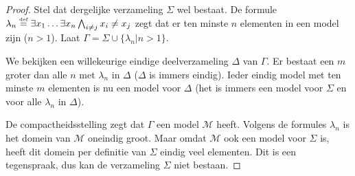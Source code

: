 \documentclass[a4paper,11pt]{article}
\begin{document}
\begin{proof}
Stel dat dergelijke verzameling $\Sigma$ wel bestaat. De formule
$\lambda_{n} \overset{\text{\tiny{def}}}{=} \exists x_{1} \ldots \exists x_{n} \bigwedge_{i \ne j} x_{i} \ne x_{j}$
zegt dat er ten minste $n$ elementen in een model zijn ($n > 1$). Laat
$\Gamma = \Sigma \cup \{\lambda_{n} | n>1\}$.

We bekijken een willekeurige eindige deelverzameling $\Delta$ van $\Gamma$. Er
bestaat een $m$ groter dan alle $n$ met $\lambda_{n}$ in $\Delta$ ($\Delta$ is
immers eindig). Ieder eindig model met ten minste $m$ elementen is nu een
model voor $\Delta$ (het is immers een model voor $\Sigma$ en voor alle
$\lambda_{n}$ in $\Delta$).

De compactheidsstelling zegt dat $\Gamma$ een model $\mathcal{M}$ heeft.
Volgens de formules $\lambda_{n}$ is het domein van $\mathcal{M}$ oneindig
groot. Maar omdat $\mathcal{M}$ ook een model voor $\Sigma$ is, heeft dit domein
per definitie van $\Sigma$ eindig veel elementen. Dit is een tegenspraak, dus
kan de verzameling $\Sigma$ niet bestaan.
\end{proof}
\end{document}
